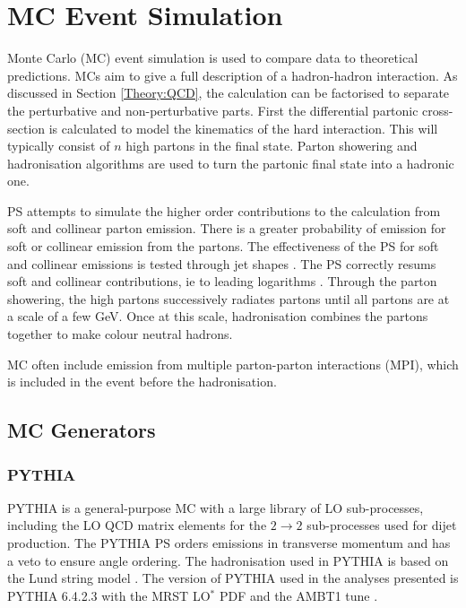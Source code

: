 \section{MC Event Simulation}
\label{Theory:MC}


Monte Carlo (MC) event simulation is used to compare data to theoretical predictions. 
MCs aim to give a full description of a hadron-hadron interaction.
As discussed in Section \ref{Theory:QCD}, the calculation can be factorised to separate the perturbative and non-perturbative parts. 
First the differential partonic cross-section is calculated to model the kinematics of the hard interaction.
This will typically consist of $n$ high \pt{} partons in the final state.
Parton showering and hadronisation algorithms are used to turn the partonic final state into a hadronic one.

PS attempts to simulate the higher order contributions to the calculation from soft and collinear parton emission.
There is a greater probability of emission for soft or collinear emission from the partons.
The effectiveness of the PS for soft and collinear emissions is tested through jet shapes \cite{ref:JetSh}.
The PS correctly resums soft and collinear contributions, ie to leading logarithms \cite{ref:Webber}.
Through the parton showering, the high \pt{} partons successively radiates partons until all partons are at a scale of a few GeV.
Once at this scale, hadronisation combines the partons together to make colour neutral hadrons. 

MC often include emission from multiple parton-parton interactions (MPI), which is included in the event before the hadronisation.



\subsection{MC Generators}
\subsubsection{PYTHIA}

PYTHIA \cite{ref:PYTHIA64} is a general-purpose MC with a large library of LO sub-processes, including the LO QCD matrix elements for the $2 \rightarrow 2$ sub-processes used for dijet production.
The PYTHIA PS orders emissions in transverse momentum and has a veto to ensure angle ordering. 
The hadronisation used in PYTHIA is based on the Lund string model \cite{ref:Lund}.
The version of PYTHIA used in the analyses presented is PYTHIA 6.4.2.3 with the MRST LO$^*$ PDF \cite{ref:MRST} and the AMBT1 tune \cite{ref:Tune}.

